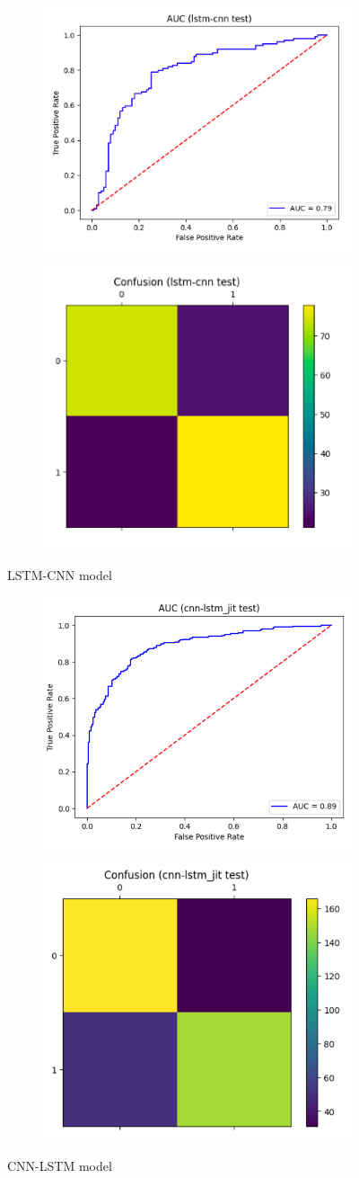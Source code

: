 \documentclass[format=sigconf, nonacm=true, review=false, screen=true]{acmart}
\begin{document}
\begin{figure}[H]
     \centering
     \begin{subfigure}
         \centering
         \includegraphics[width=0.24\columnwidth]{figures/lstm-cnn-roc.png}
     \end{subfigure}
     \begin{subfigure}
         \centering
         \includegraphics[width=0.24\columnwidth]{figures/lstm-cnn-cm.png}
     \end{subfigure}
     \caption{LSTM-CNN model}
     \label{fig:lstm-cnn-roc-cm}

     \centering
     \begin{subfigure}
         \centering
         \includegraphics[width=0.24\columnwidth]{figures/cnn-lstm-roc.png}
     \end{subfigure}
     \begin{subfigure}
         \centering
         \includegraphics[width=0.24\columnwidth]{figures/cnn-lstm-cm.png}
     \end{subfigure}
     \caption{CNN-LSTM model}
     \label{fig:cnn-lstm-roc-cm}
 \end{figure}
\end{document}

